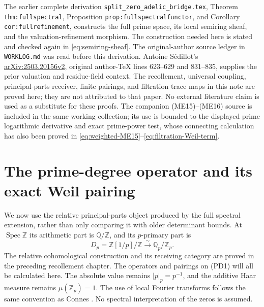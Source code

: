 \documentclass[11pt,a4paper]{article}
\theoremstyle{definition}\newtheorem{definition}[theorem]{Definition}
\newcommand{\Z}{\mathbb Z}\newcommand{\Q}{\mathbb Q}
\newcommand{\Spec}{\operatorname{Spec}}\newcommand{\SpecMon}{\operatorname{Spec}_{\mathrm{mon}}}
\begin{document}
The earlier complete derivation
\texttt{split\_zero\_adelic\_bridge.tex}, Theorem
\texttt{thm:fullspectral}, Proposition
\texttt{prop:fullspectralfunctor}, and Corollary
\texttt{cor:fullrefinement}, constructs the full prime space, its local
semiring sheaf, and the valuation-refinement morphism. The construction
needed here is stated and checked again in
\eqref{eq:semiring-sheaf}. The original-author source ledger in
\texttt{WORKLOG.md} was read before this derivation. Antoine S\'edillot's
\href{https://arxiv.org/abs/2503.20156v2}{arXiv:2503.20156v2}, original
author-TeX lines 623--629 and 831--835, supplies the prior valuation
and residue-field context. The recollement, universal coupling,
principal-parts receiver, finite pairings, and filtration trace maps
in this note are proved here; they are not attributed to that paper.
No external literature claim is used as a substitute for these proofs.
The companion (ME15)--(ME16) source is included in the same working
collection; its use is bounded to the displayed prime logarithmic
derivative and exact prime-power test, whose connecting calculation
has also been proved in \eqref{eq:weighted-ME15}--\eqref{eq:filtration-Weil-term}.




\section{The prime-degree operator and its exact Weil pairing}
\label{sec:relative-prime-degree}
We now use the relative principal-parts object produced by the full
spectral extension, rather than only comparing it with older determinant
bounds. At $\Spec\Z$ its arithmetic part is $\Q/\Z$, and its $p$-primary
part is
\[
 D_p=\Z[1/p]/\Z\xrightarrow{\ \sim\ }\Q_p/\Z_p.
 \tag{PD1}
\]
The relative cohomological construction and its receiving category are
proved in the preceding recollement chapter. The operators and pairings
on (PD1) will all be calculated here. The absolute value remains
$|p|_p=p^{-1}$, and the additive Haar measure remains $\mu(\Z_p)=1$.
The use of local Fourier transforms follows the same convention as
Connes \cite[Section III]{Connes1998}. No spectral interpretation of the
zeros is assumed.
\end{document}
